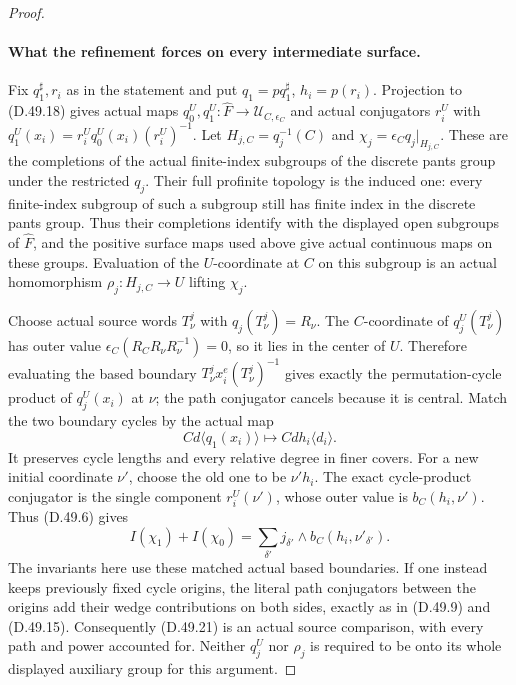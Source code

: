 \begin{proof}
\paragraph{What the refinement forces on every intermediate surface.}
Fix \(q_1^\sharp,r_i\) as in the statement and put
\(q_1=pq_1^\sharp\), \(h_i=p(r_i)\).
Projection to \textup{(D.49.18)} gives actual maps
\(q^U_0,q^U_1:\widehat F\to\mathcal U_{C,\epsilon_C}\) and actual
conjugators \(r_i^U\) with
\(q^U_1(x_i)=r_i^Uq^U_0(x_i)(r_i^U)^{-1}\).
Let \(H_{j,C}=q_j^{-1}(C)\) and
\(\chi_j=\epsilon_Cq_j|_{H_{j,C}}\).
These are the completions of the actual finite-index subgroups of
the discrete pants group under the restricted \(q_j\).
Their full profinite topology is the induced one: every finite-index
subgroup of such a subgroup still has finite index in the discrete
pants group. Thus their completions identify with the displayed
open subgroups of \(\widehat F\), and the positive surface maps
used above give actual continuous maps on these groups.
Evaluation of the \(U\)-coordinate at \(C\) on this subgroup is
an actual homomorphism \(\rho_j:H_{j,C}\to U\) lifting \(\chi_j\).

Choose actual source words \(T^j_\nu\) with
\(q_j(T^j_\nu)=R_\nu\).
The \(C\)-coordinate of \(q^U_j(T^j_\nu)\) has outer value
\(\epsilon_C(R_CR_\nu R_\nu^{-1})=0\), so it lies in the center
of \(U\). Therefore evaluating the based boundary
\(T^j_\nu x_i^e(T^j_\nu)^{-1}\) gives exactly the permutation-cycle
product of \(q^U_j(x_i)\) at \(\nu\); the path conjugator cancels
because it is central.
Match the two boundary cycles by the actual map
\[
 C d\langle q_1(x_i)\rangle
           \longmapsto C d h_i\langle d_i\rangle.
 \tag{D.49.20}
\]
It preserves cycle lengths and every relative degree in finer covers.
For a new initial coordinate \(\nu'\), choose the old one to be
\(\nu'h_i\). The exact cycle-product conjugator is the single
component \(r_i^U(\nu')\), whose outer value is
\(b_C(h_i,\nu')\). Thus \textup{(D.49.6)} gives
\[
 I(\chi_1)+I(\chi_0)
       =\sum_{\delta'} j_{\delta'}\wedge b_C(h_i,\nu'_{\delta'}).
 \tag{D.49.21}
\]
The invariants here use these matched actual based boundaries.
If one instead keeps previously fixed cycle origins, the literal
path conjugators between the origins add their wedge contributions
on both sides, exactly as in \textup{(D.49.9)} and
\textup{(D.49.15)}. Consequently \textup{(D.49.21)} is an actual
source comparison, with every path and power accounted for.
Neither \(q^U_j\) nor \(\rho_j\) is required to be onto its whole
displayed auxiliary group for this argument.


\end{proof}
